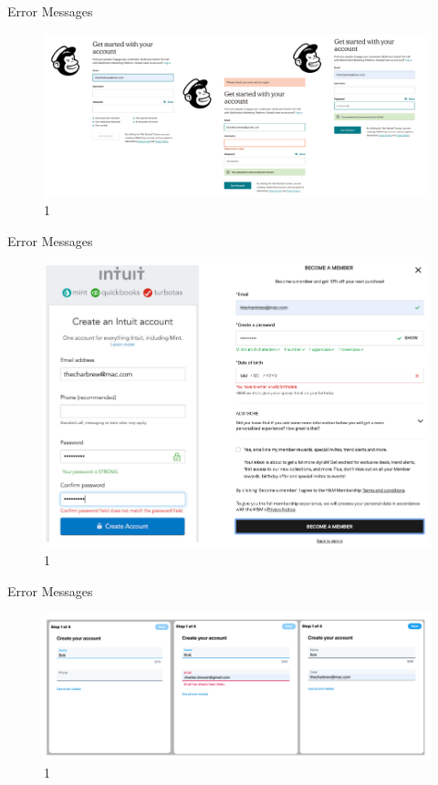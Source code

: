 \documentclass{beamer}
\begin{document}
\begin{frame}[t]{Error Messages}
	\begin{figure}[h]
		\centering
		\includegraphics[scale=0.6]{images/lec08-pic63.png}
		\caption{1}
	\end{figure}
\end{frame}

\begin{frame}[t]{Error Messages}
	\begin{figure}[h]
		\centering
		\includegraphics[scale=0.6]{images/lec08-pic64.png}
		\caption{1}
	\end{figure}
\end{frame}

\begin{frame}[t]{Error Messages}
	\begin{figure}[h]
		\centering
		\includegraphics[scale=0.6]{images/lec08-pic65.png}
		\caption{1}
	\end{figure}
\end{frame}
\end{document}
